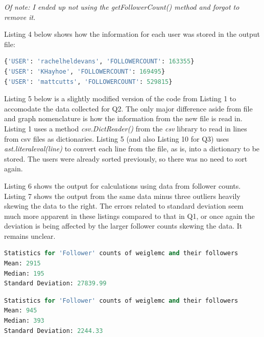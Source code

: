 \documentclass[12pt]{article}
\begin{document}
\emph{Of note: I ended up not using the getFollowerCount() method and forgot to remove it.}



Listing 4 below shows how the information for each user was stored in the output file:

\begin{lstlisting}[language=Python, caption={Examples of stored dictionaries for followers}, label=lst:copy]
{'USER': 'rachelheldevans', 'FOLLOWERCOUNT': 163355}
{'USER': 'KHayhoe', 'FOLLOWERCOUNT': 169495}
{'USER': 'mattcutts', 'FOLLOWERCOUNT': 529815}
\end{lstlisting}

Listing 5 below is a slightly modified version of the code from Listing 1 to accomodate the data collected for Q2. The only major difference aside from file and graph nomenclature is how the information from the new file is read in. Listing 1 uses a method \emph{csv.DictReader()} from the \emph{csv} library to read in lines from csv files as dictionaries. Listing 5 (and also Listing 10 for Q3) uses \emph{ast.literal\textunderscore eval(line)} to convert each line from the file, as is, into a dictionary to be stored. The users were already sorted previously, so there was no need to sort again.



\par Listing 6 shows the output for calculations using data from follower counts. Listing 7 shows the output from the same data minus three outliers heavily skewing the data to the right. The errors related to standard deviation seem much more apparent in these listings compared to that in Q1, or once again the deviation is being affected by the larger follower counts skewing the data. It remains unclear.

\begin{lstlisting}[language=Python, caption={Calculated mean, median, and standard deviation for Q2}, label=lst:copy]
Statistics for 'Follower' counts of weiglemc and their followers
Mean: 2915
Median: 195
Standard Deviation: 27839.99
\end{lstlisting}

\begin{lstlisting}[language=Python, caption={Calculated mean, median, and standard deviation for Q2, excluding a few outliers}, label=lst:copy]
Statistics for 'Follower' counts of weiglemc and their followers
Mean: 945
Median: 393
Standard Deviation: 2244.33
\end{lstlisting}
\end{document}

